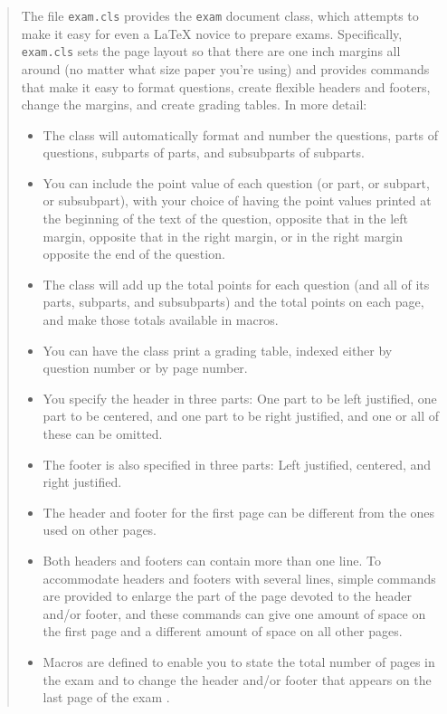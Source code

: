 \documentclass[12pt,a4paper]{exam}
\begin{document}
\begin{quote}
The file \verb"exam.cls" provides the \verb"exam" document class,
which attempts to make it easy for even a \LaTeX{} novice to prepare
exams.  Specifically, \verb"exam.cls" sets the page layout so that
there are one inch margins all around (no matter what
size paper you're using) and provides commands that make it easy to
format questions, create flexible headers and footers, change the
margins, and create grading tables.  In more detail:
\begin{itemize}
\item The class will automatically format and number the questions,
  parts of questions, subparts of parts, and subsubparts of subparts.
\item You can include the point value of each question
  (or part, or subpart, or subsubpart), with your choice of having the
  point values printed at the beginning of the text of the question,
  opposite that in the left margin, opposite that in the right margin,
  or in the right margin opposite the end of the question.
\item The class will add up the total points for each question (and
  all of its parts, subparts, and subsubparts) and the total
  points on each page, and make those totals
  available in macros.
\item You can have the class print a grading table, indexed either by
  question number or by page number.
\item You specify the header in three parts: One part to be left
  justified, one part to be centered, and one part to be right
  justified, and one or all of these can be omitted.
\item The footer is also specified in three parts: Left justified,
  centered, and right justified.
\item The header and footer for the first page can be different from
  the ones used on other pages.
\item Both headers and footers can contain more than one line. To
  accommodate headers and footers with several lines, simple commands
  are provided to enlarge the part of the page devoted to the header
  and/or footer, and these commands can give one amount of space on
  the first page and a different amount of space on all other pages.
\item Macros are defined to enable you to state the total number of
  pages in the exam and to change the
  header and/or footer that appears on the last page of the exam .

\end{itemize}
\end{quote}
\end{document}
